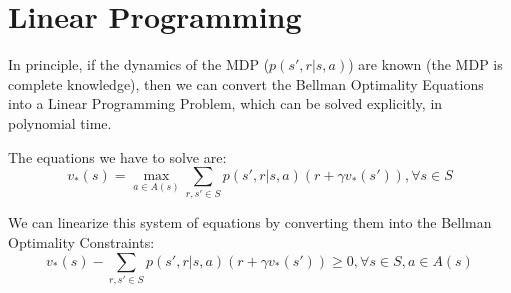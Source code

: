 \documentclass[12pt]{report}
\begin{document}




\section{Linear Programming}
In principle, if the dynamics of the MDP ($p(s', r | s, a)$) are known (the MDP is complete knowledge), then we can convert the Bellman Optimality Equations into a Linear Programming Problem, which can be solved explicitly, in polynomial time.

The equations we have to solve are:
\begin{equation}
    v_{*}(s) = \max\limits_{a \in A(s)} \sum\limits_{r, s' \in S} p(s', r | s, a) (r + \gamma v_{*}(s')), \forall s \in S
\end{equation}

We can linearize this system of equations by converting them into the Bellman Optimality Constraints:
\begin{equation}
    v_{*}(s) - \sum\limits_{r, s' \in S} p(s', r | s, a) (r + \gamma v_{*}(s')) \geq 0, \forall s \in S, a \in A(s)
\end{equation}
\end{document}
